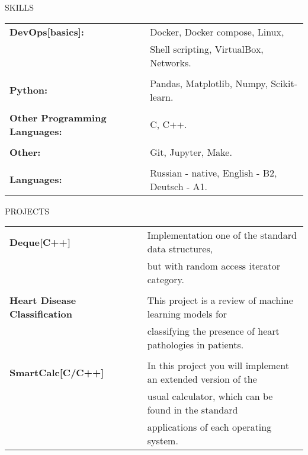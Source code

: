 \documentclass{resume} %
\begin{document}
\begin{rSection}{SKILLS}

\begin{tabular}{ @{} >{\bfseries}l @{\hspace{6ex}} l }
DevOps[basics]: & Docker, Docker compose, Linux, \\
\ &              Shell scripting, VirtualBox, Networks.\\ \\
Python: & Pandas, Matplotlib, Numpy, Scikit-learn. \\  \\
Other Programming Languages: &  C, C++.  \\ \\
Other: &         Git, Jupyter, Make. \\ \\
Languages: & Russian - native, English - B2, Deutsch - A1.

\end{tabular}

\end{rSection}

\begin{rSection}{PROJECTS}

\begin{tabular}{ @{} >{\bfseries}l @{\hspace{6ex}} l }
Deque[C++] & Implementation one of the standard data structures, \\ \ & but with random access iterator category. \\ \\
Heart Disease Classification \ \ \ \  \ \ & This project is a review of machine learning models for \\
\ & classifying the presence of heart pathologies in patients. \\ \\
SmartCalc[C/C++] & In this project you will implement an extended version of the \\ \ & usual calculator,  which can be found in the standard \\ \ & applications of each operating system.




\end{tabular}

\end{rSection}


\end{document}
